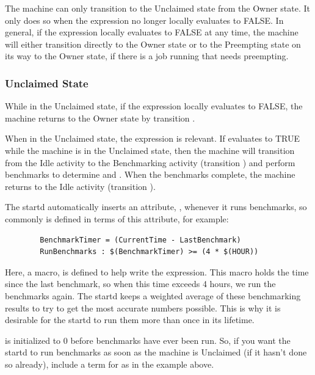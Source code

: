 The machine can only transition to the Unclaimed state from the Owner state.
It only does so when the  expression no longer locally
evaluates to FALSE.
In general, if the 
expression locally evaluates to FALSE at any time,
the machine will either transition directly to the Owner state
or to the Preempting state on its way to the Owner state,
if there is a job running that needs preempting.

\subsubsection{\label{sec:Unclaimed-State}Unclaimed State}

While in the Unclaimed state, if the  expression locally
evaluates to FALSE, the machine returns to the Owner state by
transition .

When in the Unclaimed state,
the  \label{param:RunBenchmarks}  
expression is relevant.
If  evaluates to TRUE while the machine
is in the Unclaimed state,
then the machine will transition from the Idle
activity to the Benchmarking activity (transition ) and
perform benchmarks to determine  and .  
When the benchmarks complete, the machine returns to the Idle activity
(transition ).

The startd automatically inserts an attribute, ,
whenever it runs benchmarks, so commonly  is
defined in terms of this attribute, for example:
\begin{verbatim}
        BenchmarkTimer = (CurrentTime - LastBenchmark)
        RunBenchmarks : $(BenchmarkTimer) >= (4 * $(HOUR))
\end{verbatim}
Here, a macro,  is defined to help write the
expression.
This macro holds the time since the last benchmark,
so when this time exceeds 4 hours, we run the benchmarks again.
The startd keeps a weighted average of these benchmarking
results to try to get the most accurate numbers possible.
This is why
it is desirable for 
the startd to run them more than once in its lifetime.

\Note {} is initialized to 0 before benchmarks
have ever been run.
So, if you want the startd to run benchmarks as soon as the machine is
Unclaimed (if it hasn't done so already),
include a term for  as in the example above.

